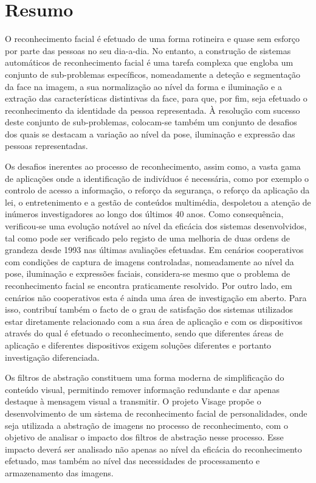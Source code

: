 \chapter*{Resumo}
O reconhecimento facial é efetuado de uma forma rotineira e quase sem esforço por parte das pessoas no seu dia-a-dia. No entanto, a construção de sistemas automáticos de reconhecimento facial é uma tarefa complexa que engloba um conjunto de sub-problemas específicos, nomeadamente a deteção e segmentação da face na imagem, a sua normalização ao nível da forma e iluminação e a extração das características distintivas da face, para que, por fim, seja efetuado o reconhecimento da identidade da pessoa representada. À resolução com sucesso deste conjunto de sub-problemas, colocam-se também um conjunto de desafios dos quais se destacam a variação ao nível da pose, iluminação e expressão das pessoas representadas.

Os desafios inerentes ao processo de reconhecimento, assim como, a vasta gama de aplicações onde a identificação de indivíduos é necessária, como por exemplo o controlo de acesso a informação, o reforço da segurança, o reforço da aplicação da lei, o entretenimento e a gestão de conteúdos multimédia, despoletou a atenção de inúmeros investigadores ao longo dos últimos 40 anos. Como consequência, verificou-se uma evolução notável ao nível da eficácia dos sistemas desenvolvidos, tal como pode ser verificado pelo registo de uma melhoria de duas ordens de grandeza desde 1993 nas últimas avaliações efetuadas. Em cenários cooperativos com condições de captura de imagens controladas, nomeadamente ao nível da pose, iluminação e expressões faciais, considera-se mesmo que o problema de reconhecimento facial se encontra praticamente resolvido. Por outro lado, em cenários não cooperativos esta é ainda uma área de investigação em aberto. Para isso, contribuí também o facto de o grau de satisfação dos sistemas utilizados estar diretamente relacionado com a sua área de aplicação e com os dispositivos através do qual é efetuado o reconhecimento, sendo que diferentes áreas de aplicação e diferentes dispositivos exigem soluções diferentes e portanto investigação diferenciada.

Os filtros de abstração constituem uma forma moderna de simplificação do conteúdo visual, permitindo remover informação redundante e dar apenas destaque à mensagem visual a transmitir. O projeto Visage propõe o desenvolvimento de um sistema de reconhecimento facial de personalidades, onde seja utilizada a abstração de imagens no processo de reconhecimento, com o objetivo de analisar o impacto dos filtros de abstração nesse processo. Esse impacto deverá ser analisado não apenas ao nível da eficácia do reconhecimento efetuado, mas também ao nível das necessidades de processamento e armazenamento das imagens.

